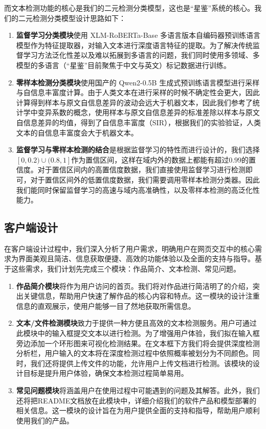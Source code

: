 \documentclass[a4paper]{report}
\begin{document}
而文本检测功能的核心是我们的二元检测分类模型，这也是“星鉴”系统的核心。我们的二元检测分类模型设计思路如下：
\begin{enumerate}
	\item \textbf{监督学习分类模块}使用 XLM-RoBERTa-Base 多语言版本自编码器预训练语言模型作为特征提取器，对输入文本进行深度语言特征的提取。为了解决传统监督学习方法泛化性差以及难以拓展到多语言的问题，我们同时使用多领域、多模型的多语言（“星鉴”目前聚焦于中文与英文）标记数据进行训练。
	\item \textbf{零样本检测分类模块}使用国产的 Qwen2-0.5B 生成式预训练语言模型进行采样与自信息丰富度计算。由于人类文本在进行采样的时候不确定性会更大，因此计算得到样本与原文自信息差异的波动会远大于机器文本，因此我们参考了统计学中变异系数的概念，使用样本与原文自信息差异的标准差除以样本与原文自信息差异的均值，得到了自信息丰富度（SIR），根据我们的实验验证，人类文本的自信息丰富度会大于机器文本。
	\item \textbf{监督学习与零样本检测的结合}是根据监督学习的特性而进行设计的，我们选择 $[0, 0.2) \cup (0.8, 1] $作为置信区间，这样在域内外的数据上都能有超过$0.99$的置信度。对于置信区间内的高置信度数据，我们直接使用监督学习进行检测即可，对于置信区间外的低置信度数据，我们需要调用零样本检测分类器。因此我们能同时保留监督学习的高速与域内高准确性，以及零样本检测的高泛化性能力。

\end{enumerate}


\subsection{客户端设计}
在客户端设计过程中，我们深入分析了用户需求，明确用户在网页交互中的核心需求为界面美观且简洁、信息获取便捷、高效的功能体验以及全面的支持与指导。基于这些需求，我们计划先完成三个模块：作品简介、文本检测、常见问题。

\begin{enumerate}
	\item \textbf{作品简介模块}将作为用户访问的首页。我们将对作品进行简洁明了的介绍，突出关键信息，帮助用户快速了解作品的核心内容和特点。这一模块的设计注重信息的直观展示，使用户能够一目了然地获取所需信息。

	\item \textbf{文本/文件检测模块}致力于提供一种方便且高效的文本检测服务。用户可通过此模块中的输入框提交文本以进行检测。为了增强用户体验，我们拟在输入框旁边添加一个环形图来可视化检测结果。在文本框下方我们将会提供深度检测分析栏，用户输入的文本将在深度检测过程中依照概率被划分为不同颜色。同时，我们还将提供上传文件的功能，允许用户上传文档进行检测。该模块的设计目标是提升用户体验，确保文本检测过程简单易用。

	\item \textbf{常见问题模块}将涵盖用户在使用过程中可能遇到的问题及其解答。此外，我们还将把README文档放在此模块中，详细介绍我们的软件产品和模型部署的相关信息。这一模块的设计旨在为用户提供全面的支持和指导，帮助用户顺利使用我们的产品。

\end{enumerate}
\end{document}
